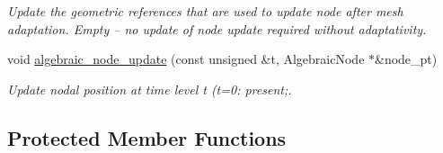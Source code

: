 \begin{DoxyCompactItemize}
\begin{DoxyCompactList}\small\item\em Update the geometric references that are used to update node after mesh adaptation. Empty -- no update of node update required without adaptativity. \end{DoxyCompactList}\item 
void \hyperlink{classoomph_1_1AlgebraicCylinderWithFlagMesh_a5e1e770e82577e5702470d8b87f8599d}{algebraic\+\_\+node\+\_\+update} (const unsigned \&t, Algebraic\+Node $\ast$\&node\+\_\+pt)
\begin{DoxyCompactList}\small\item\em Update nodal position at time level t (t=0\+: present;. \end{DoxyCompactList}\end{DoxyCompactItemize}
\subsection*{Protected Member Functions}
